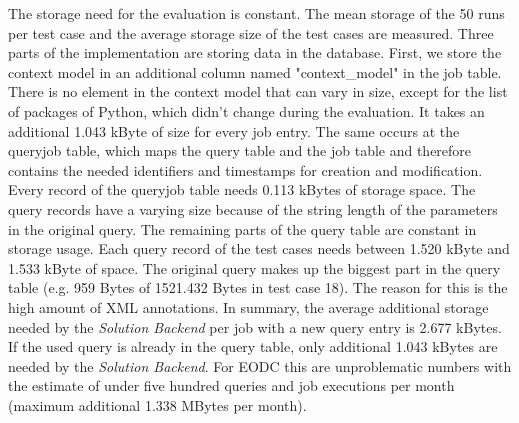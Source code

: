 \documentclass[draft,final]{vutinfth} %
\begin{document}
The storage need for the evaluation is constant. The mean storage of the 50 runs per test case and the average storage size of the test cases are measured. Three parts of the implementation are storing data in the database. First, we store the context model in an additional column named "context\_model" in the job table. There is no element in the context model that can vary in size, except for the list of packages of Python, which didn't change during the evaluation. It takes an additional 1.043 kByte of size for every job entry. The same occurs at the queryjob table, which maps the query table and the job table and therefore contains the needed identifiers and timestamps for creation and modification. Every record of the queryjob table needs 0.113 kBytes of storage space.
The query records have a varying size because of the string length of the parameters in the original query. The remaining parts of the query table are constant in storage usage. Each query record of the test cases needs between 1.520 kByte and 1.533 kByte of space. The original query makes up the biggest part in the query table (e.g. 959 Bytes of 1521.432 Bytes in test case 18). The reason for this is the high amount of XML annotations. In summary, the average additional storage needed by the \textit{Solution Backend} per job with a new query entry is 2.677 kBytes. If the used query is already in the query table, only additional 1.043 kBytes are needed by the \textit{Solution Backend}. {For EODC this are unproblematic numbers with the estimate of under five hundred queries and job executions per month (maximum additional 1.338 MBytes per month).}
\newpage
\end{document}
